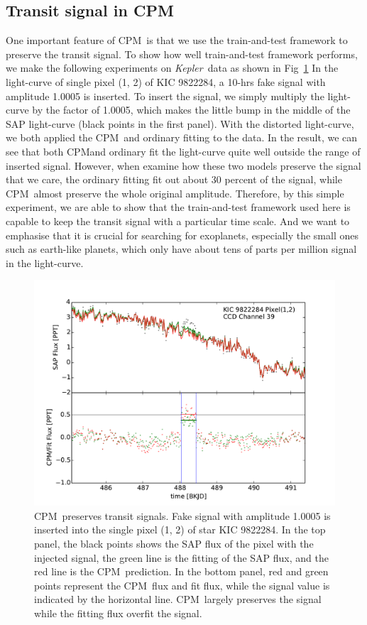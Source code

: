 \documentclass[12pt, preprint]{aastex}
\newcommand{\project}[1]{\textsl{#1}}
\newcommand{\Kepler}{\project{Kepler}}
\newcommand{\name}{CPM}
\begin{document}
\subsection{Transit signal in \name}
One important feature of \name\ is that we use the train-and-test framework to preserve 
the transit signal. To show how well train-and-test framework performs, we make the
following experiments on \Kepler\ data as shown in Fig~\ref{distortion}
In the light-curve of single pixel (1, 2) of KIC 9822284, a 10-hrs fake signal 
with amplitude 1.0005 is inserted. To insert the signal, we simply multiply the light-curve 
by the factor of 1.0005, which makes the little bump in the middle of the SAP light-curve 
(black points in the first panel). With the distorted light-curve, we both applied the 
\name\ and ordinary fitting to the data. In the result, we can see that both \name and 
ordinary fit the light-curve quite well outside the range of inserted signal. However, 
when examine how these two models preserve the signal that we care, the ordinary
fitting fit out about 30 percent of the signal, while \name\ almost preserve the whole 
original amplitude. Therefore,  by this simple experiment, we are able to show that 
the train-and-test framework used here is capable to keep the transit signal with 
a particular time scale. And we want to emphasise that it is crucial for searching for
exoplanets, especially the small ones such as earth-like planets, which only have  
about tens of parts per million signal in the light-curve.

\begin{figure}[htb]
\centering
\includegraphics[width=\columnwidth]{distortion_9822284_normal}
\caption{
  \label{distortion} 
  \name\ preserves transit signals. 
  Fake signal with amplitude 1.0005 is inserted into the single pixel (1, 2) of star KIC 9822284. 
  In the top panel, the black points shows the SAP flux of the pixel with the injected signal, 
    the green line is the fitting of the SAP flux, and the red line is the \name\ prediction. 
  In the bottom panel, red and green points represent the \name\ flux and fit flux, 
    while the signal value is indicated by the horizontal line. 
  \name\ largely preserves the signal while the fitting flux overfit the signal.}
\end{figure}
\end{document}
